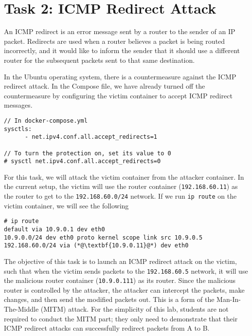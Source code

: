 \section{Task 2: ICMP Redirect Attack}

An ICMP redirect is an error message sent by a router to the sender of an
IP packet. Redirects are used when a router believes a packet is being
routed incorrectly, and it would like to inform the sender that it should
use a different router for the subsequent packets sent to that same
destination.


In the Ubuntu operating system, 
there is a countermeasure against the ICMP redirect attack. In the 
Compose file, we have already 
turned off the countermeasure by configuring the victim container
to accept ICMP redirect messages. 

\begin{lstlisting}
// In docker-compose.yml
sysctls:
      - net.ipv4.conf.all.accept_redirects=1

// To turn the protection on, set its value to 0
# sysctl net.ipv4.conf.all.accept_redirects=0
\end{lstlisting}


For this task, we will attack the victim container from 
the attacker container. In the current setup, 
the victim will use the router container (\texttt{192.168.60.11}) as
the router to get to the \texttt{192.168.60.0/24} network. If
we run \texttt{ip route} on the victim container, we will
see the following

\begin{lstlisting}
# ip route
default via 10.9.0.1 dev eth0 
10.9.0.0/24 dev eth0 proto kernel scope link src 10.9.0.5 
192.168.60.0/24 via (*@\textbf{10.9.0.11}@*) dev eth0
\end{lstlisting}
 
The objective of this task is to launch an ICMP redirect attack on the victim,
such that when the victim sends packets to the \texttt{192.168.60.5}
network, it will use the malicious router container (\texttt{10.9.0.111})
as its router. 
Since the malicious router is controlled by the attacker, the attacker can 
intercept the packets, make changes, and then send 
the modified packets out. This is a form of the Man-In-The-Middle (MITM) attack. 
For the simplicity of this lab, students are not required to 
conduct the MITM part; they only need to demonstrate that 
their ICMP redirect attacks can successfully redirect
packets from A to B.



